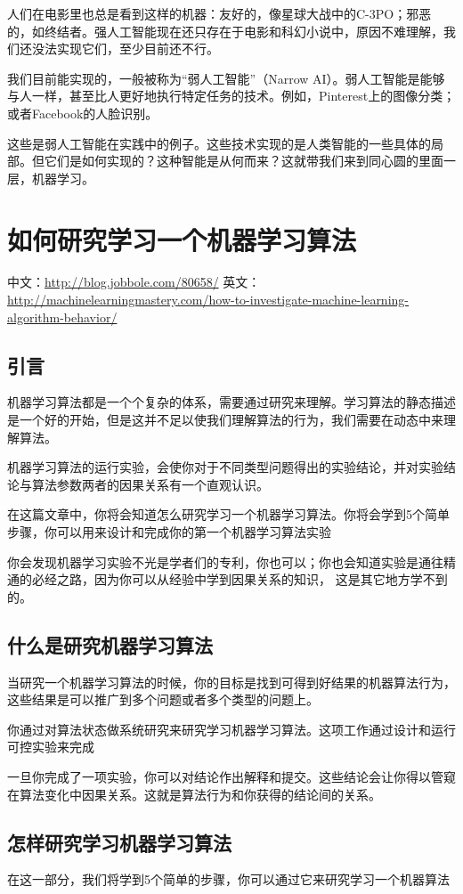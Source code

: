 \documentclass[a4paper,12pt]{ctexbook}
\begin{document}
人们在电影里也总是看到这样的机器：友好的，像星球大战中的C-3PO；邪恶的，如终结者。强人工智能现在还只存在于电影和科幻小说中，原因不难理解，我们还没法实现它们，至少目前还不行。

我们目前能实现的，一般被称为“弱人工智能”（Narrow AI）。弱人工智能是能够与人一样，甚至比人更好地执行特定任务的技术。例如，Pinterest上的图像分类；或者Facebook的人脸识别。

这些是弱人工智能在实践中的例子。这些技术实现的是人类智能的一些具体的局部。但它们是如何实现的？这种智能是从何而来？这就带我们来到同心圆的里面一层，机器学习。

\chapter{如何研究学习一个机器学习算法}
中文：\url{http://blog.jobbole.com/80658/}
英文：\url{http://machinelearningmastery.com/how-to-investigate-machine-learning-algorithm-behavior/}
\section{引言}
机器学习算法都是一个个复杂的体系，需要通过研究来理解。学习算法的静态描述是一个好的开始，但是这并不足以使我们理解算法的行为，我们需要在动态中来理解算法。

机器学习算法的运行实验，会使你对于不同类型问题得出的实验结论，并对实验结论与算法参数两者的因果关系有一个直观认识。

在这篇文章中，你将会知道怎么研究学习一个机器学习算法。你将会学到5个简单步骤，你可以用来设计和完成你的第一个机器学习算法实验

你会发现机器学习实验不光是学者们的专利，你也可以；你也会知道实验是通往精通的必经之路，因为你可以从经验中学到因果关系的知识， 这是其它地方学不到的。

\section{什么是研究机器学习算法}
当研究一个机器学习算法的时候，你的目标是找到可得到好结果的机器算法行为，这些结果是可以推广到多个问题或者多个类型的问题上。

你通过对算法状态做系统研究来研究学习机器学习算法。这项工作通过设计和运行可控实验来完成

一旦你完成了一项实验，你可以对结论作出解释和提交。这些结论会让你得以管窥在算法变化中因果关系。这就是算法行为和你获得的结论间的关系。

\section{怎样研究学习机器学习算法}
在这一部分，我们将学到5个简单的步骤，你可以通过它来研究学习一个机器算法
\end{document}
